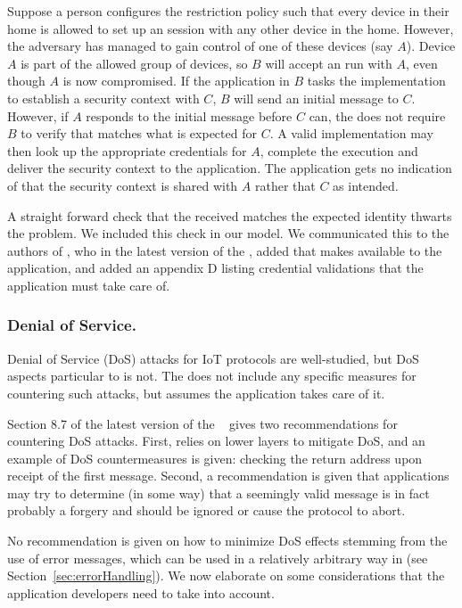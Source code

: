 \documentclass[runningheads]{llncs}
\begin{document}
Suppose a person configures the restriction policy such that every device in
their home is allowed to set up an \mEdhoc{} session with any other device in
the home.
%
However, the adversary has managed to gain control of one of these devices 
(say
$A$).
%
Device $A$ is part of the allowed group of devices, so $B$ will accept an
\mEdhoc{} run with $A$, even though $A$ is now compromised.
%
If the application in $B$ tasks the \mEdhoc{} implementation to establish a
security context with $C$, $B$ will send an initial message to $C$.
%
However, if $A$ responds to the initial message before $C$ can, the \mSpec{}
does not require $B$ to verify that \mIdcredr{} matches what is expected for
$C$.
%
A valid \mEdhoc{} implementation may then look up the appropriate 
credentials
for $A$, complete the execution and deliver the security context to the
application.
%
The application gets no indication of that the security context is shared with
$A$ rather that $C$ as intended.
%

A straight forward check that the received \mIdcredr{} matches the expected
identity thwarts the problem.
%
We included this check in our model.
%
We communicated this to the authors of \mEdhoc{}, who in the latest version 
of
the \mSpec{}, added that \mEdhoc{} makes \mIdcredr{} available to the
application, and added an appendix D listing credential validations 
that
the application must take care of.
%

\subsubsection{Denial of Service.}
Denial of Service (DoS) attacks for IoT protocols are well-studied,
but DoS aspects particular to \mEdhoc{} is not.
%
The \mSpec{} does not include any specific measures for countering such 
attacks,
but assumes the application takes care of it.

Section 8.7 of the latest version of the \mEdhoc{}
\mSpec{}~\cite{draft-ietf-lake-edhoc-15}
gives two recommendations for countering DoS attacks.
%
First, \mEdhoc{} relies on lower layers to mitigate DoS, and an example of DoS
countermeasures is given: checking the return address upon receipt of the 
first
message.
%
Second, a recommendation is given that applications may try to determine (in
some way) that a seemingly valid message is in fact probably a forgery and
should be ignored or cause the protocol to abort.
%

No recommendation is given on how to minimize DoS effects stemming from 
the use
of error messages, which can be used in a relatively arbitrary way in 
\mEdhoc{}
(see Section~\ref{sec:errorHandling}).
%
We now elaborate on some considerations that the application developers 
need to
take into account.
%
\end{document}
